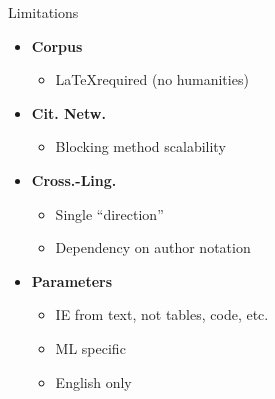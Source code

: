 \documentclass[en,16:9,smallfoot]{sdqbeamer}
\begin{document}
   \begin{frame}{Limitations}
    \begin{itemize}
    \item \textbf{Corpus}
        \begin{itemize}
        \item \LaTeX required (no humanities)
        \end{itemize}
    \item \textbf{Cit. Netw.}
        \begin{itemize}
        \item Blocking method scalability
        \end{itemize}
    \item \textbf{Cross.-Ling.}
        \begin{itemize}
        \item Single ``direction''
        \item Dependency on author notation
        \end{itemize}
    \item \textbf{Parameters}
        \begin{itemize}
        \item IE from text, not tables, code, etc.
        \item ML specific
        \item English only
        \end{itemize}
    \end{itemize}
   \end{frame}

\end{document}
